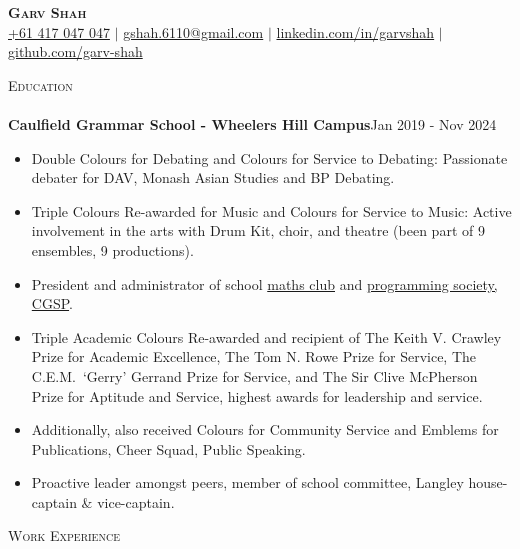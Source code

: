 \documentclass[a4paper]{article}
\newcommand{\lineunder} {
    \vspace*{-8pt} \\
    \hspace*{-18pt} \hrulefill \\
}
\newcommand{\header} [1] {
    {\hspace*{-18pt}\vspace*{6pt} \textsc{#1}}
    \vspace*{-6pt} \lineunder
}
\begin{document}
\vspace*{-40pt}



\vspace*{-20pt}

\begin{center}
    \textbf{\Huge \scshape Garv Shah} \\ \vspace{1pt}
    \small \href{tel:+61417047047}{+61 417 047 047} $|$ \href{mailto:gshah.6110@gmail.com}{gshah.6110@gmail.com} $|$
    \href{https://www.linkedin.com/in/garvshah/}{linkedin.com/in/garvshah} $|$
    \href{https://garv-shah.github.io/}{github.com/garv-shah}
\end{center}
\vspace{-2mm}

\header{Education}
\textbf{Caulfield Grammar School - Wheelers Hill Campus}\hfill Jan 2019 - Nov 2024\\
\begin{itemize} \itemsep 1pt
	\item Double Colours for Debating and Colours for Service to Debating: Passionate debater for DAV, Monash Asian Studies and BP Debating.
        \item Triple Colours Re-awarded for Music and Colours for Service to Music: Active involvement in the arts with Drum Kit, choir, and theatre (been part of 9 ensembles, 9 productions).
        \item President and administrator of school \href{https://cgs-math.github.io/}{maths club} and \href{https://cgs-programming.github.io}{programming society, CGSP}.
        \item Triple Academic Colours Re-awarded and recipient of The Keith V. Crawley Prize for Academic Excellence, The Tom N. Rowe Prize for Service, The C.E.M.\ ‘Gerry’ Gerrand Prize for Service, and The Sir Clive McPherson Prize for Aptitude and Service, highest awards for leadership and service.
        \item Additionally, also received Colours for Community Service and Emblems for Publications, Cheer Squad, Public Speaking.
        \item Proactive leader amongst peers, member of school committee, Langley house-captain \& vice-captain.
\end{itemize}

\header{Work Experience}
\vspace{1mm}
\end{document}
